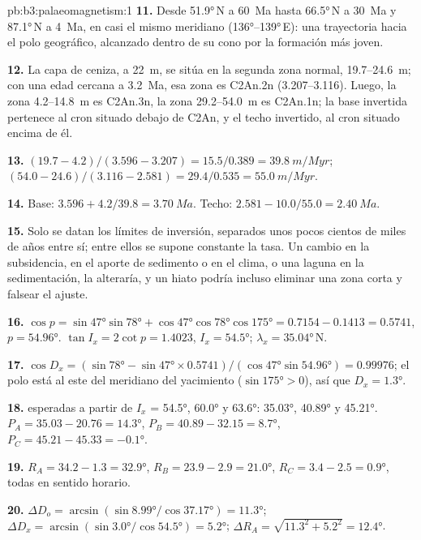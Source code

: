 \begin{solution}{pb:b3:palaeomagnetism:1}
\textbf{11.} Desde \ang{51.9}\,N a \qty{60}{Ma} hasta \ang{66.5}\,N a
\qty{30}{Ma} y \ang{87.1}\,N a \qty{4}{Ma}, en casi el mismo meridiano
(\ang{136}--\ang{139}\,E): una trayectoria hacia el polo geográfico, alcanzado dentro
de su cono por la formación más joven.

\textbf{12.} La capa de ceniza, a \qty{22}{m}, se sitúa en la segunda zona normal,
19.7--\qty{24.6}{m}; con una edad cercana a \qty{3.2}{Ma}, esa zona es C2An.2n
(3.207--3.116). Luego, la zona 4.2--\qty{14.8}{m} es C2An.3n, la zona
29.2--\qty{54.0}{m} es C2An.1n; la base invertida pertenece al cron situado debajo de
C2An, y el techo invertido, al cron situado encima de él.

\textbf{13.} $(19.7 - 4.2)/(3.596 - 3.207) = 15.5/0.389 = \qty{39.8}{m/Myr}$;
$(54.0 - 24.6)/(3.116 - 2.581) = 29.4/0.535 = \qty{55.0}{m/Myr}$.

\textbf{14.} Base: $3.596 + 4.2/39.8 = \qty{3.70}{Ma}$. Techo: $2.581 -
10.0/55.0 = \qty{2.40}{Ma}$.

\textbf{15.} Solo se datan los límites de inversión, separados unos pocos cientos de miles de años
entre sí; entre ellos se supone constante la tasa. Un cambio en la subsidencia, en el
aporte de sedimento o en el clima, o una laguna en la sedimentación, la alteraría, y un
hiato podría incluso eliminar una zona corta y falsear el ajuste.

\textbf{16.} $\cos p = \sin\ang{47}\sin\ang{78} + \cos\ang{47}\cos\ang{78}
\cos\ang{175} = 0.7154 - 0.1413 = 0.5741$, $p = \ang{54.96}$. $\tan I_x =
2\cot p = 1.4023$, $I_x = \ang{54.5}$; $\lambda_x = \ang{35.04}$\,N.

\textbf{17.} $\cos D_x = (\sin\ang{78} - \sin\ang{47}\times0.5741)/
(\cos\ang{47}\sin\ang{54.96}) = 0.99976$; el polo está al este del
meridiano del yacimiento ($\sin\ang{175} > 0$), así que $D_x = \ang{1.3}$.

\textbf{18.}  esperadas a partir de $I_x$ = \ang{54.5}, \ang{60.0} y
\ang{63.6}: \ang{35.03}, \ang{40.89} y \ang{45.21}. $P_A = 35.03 - 20.76 =
\ang{14.3}$, $P_B = 40.89 - 32.15 = \ang{8.7}$, $P_C = 45.21 - 45.33 =
\ang{-0.1}$.

\textbf{19.} $R_A = 34.2 - 1.3 = \ang{32.9}$, $R_B = 23.9 - 2.9 = \ang{21.0}$,
$R_C = 3.4 - 2.5 = \ang{0.9}$, todas en sentido horario.

\textbf{20.} $\Delta D_o = \arcsin(\sin\ang{8.99}/\cos\ang{37.17}) = \ang{11.3}$;
$\Delta D_x = \arcsin(\sin\ang{3.0}/\cos\ang{54.5}) = \ang{5.2}$; $\Delta R_A =
\sqrt{11.3^2 + 5.2^2} = \ang{12.4}$.


\end{solution}
